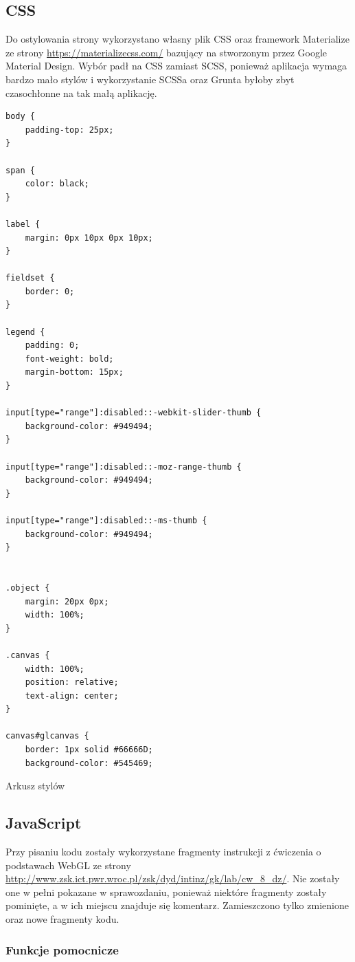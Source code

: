 \documentclass[12pt,a4paper,titlepage]{article}
\newenvironment{longlisting}{}{}
\begin{document}
\subsection{CSS}
Do ostylowania strony wykorzystano własny plik CSS oraz framework Materialize ze strony \url{https://materializecss.com/} bazujący na stworzonym przez Google Material Design. Wybór padł na CSS zamiast SCSS, ponieważ aplikacja wymaga bardzo mało stylów i wykorzystanie SCSSa oraz Grunta byłoby zbyt czasochłonne na tak małą aplikację.
\begin{longlisting}
\begin{verbatim}
body {
    padding-top: 25px;
}

span {
    color: black;
}

label {
    margin: 0px 10px 0px 10px;
}

fieldset {
    border: 0;
}

legend {
    padding: 0;
    font-weight: bold;
    margin-bottom: 15px;
}

input[type="range"]:disabled::-webkit-slider-thumb {
    background-color: #949494;
}

input[type="range"]:disabled::-moz-range-thumb {
    background-color: #949494;
}

input[type="range"]:disabled::-ms-thumb {
    background-color: #949494;
}


.object {
    margin: 20px 0px;
    width: 100%;
}

.canvas {
    width: 100%;
    position: relative;
    text-align: center;
}

canvas#glcanvas {
    border: 1px solid #66666D;
    background-color: #545469;
\end{verbatim}
\end{longlisting}
\begin{listing}
\caption{Arkusz stylów}
\end{listing}

\subsection{JavaScript}
Przy pisaniu kodu zostały wykorzystane fragmenty instrukcji z ćwiczenia o podstawach WebGL ze strony \url{http://www.zsk.ict.pwr.wroc.pl/zsk/dyd/intinz/gk/lab/cw\_8\_dz/}. Nie zostały one w pełni pokazane w sprawozdaniu, ponieważ niektóre fragmenty zostały pominięte, a w ich miejscu znajduje się komentarz. Zamieszczono tylko zmienione oraz nowe fragmenty kodu.

\subsubsection{Funkcje pomocnicze}
\end{document}
